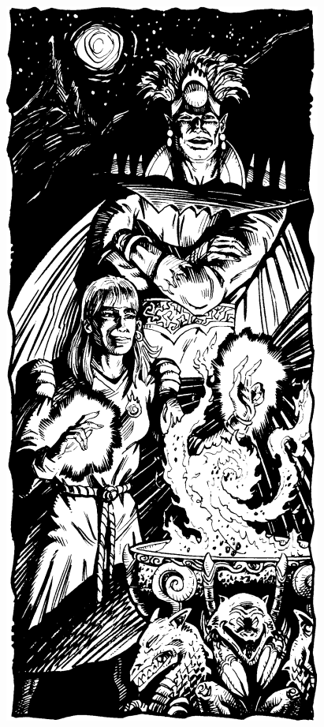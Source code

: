 \begin{figure}[t!]
\centering
\includegraphics[width=\columnwidth+2mm]{images/cleric-2.png}
\WOTC
\end{figure}

